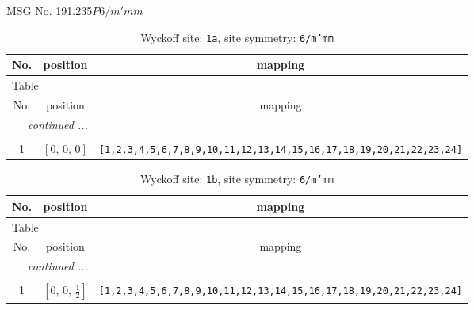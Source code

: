\documentclass[fleqn,8pt]{jsarticle}
\begin{document}
\setcounter{MaxMatrixCols}{32}

\renewcommand{\tablename}{Table~}
\renewcommand{\figurename}{Figure~}
\begin{center}
\LARGE
MSG No. 191.235\quad$P6/m'mm$
\end{center}
\renewcommand{\arraystretch}{1.2}
\begin{longtable}{ccc}
\caption{Wyckoff site: {\tt 1a}, site symmetry: {\tt 6/m'mm}}
 \\
 \hline \hline
No. & position & mapping \\ \hline \endfirsthead

\multicolumn{2}{l}{\tablename\ \thetable{}} \\
 \hline \hline
No. & position & mapping \\ \hline \endhead

 \hline \hline
\multicolumn{2}{r}{\footnotesize\it continued ...} \\ \endfoot

 \hline \hline
\multicolumn{2}{r}{} \\ \endlastfoot

1 & $\left[ 0,\, 0,\, 0 \right]$ & {\tt [1,2,3,4,5,6,7,8,9,10,11,12,13,14,15,16,17,18,19,20,21,22,23,24]} \\
\end{longtable}
\renewcommand{\arraystretch}{1.2}
\begin{longtable}{ccc}
\caption{Wyckoff site: {\tt 1b}, site symmetry: {\tt 6/m'mm}}
 \\
 \hline \hline
No. & position & mapping \\ \hline \endfirsthead

\multicolumn{2}{l}{\tablename\ \thetable{}} \\
 \hline \hline
No. & position & mapping \\ \hline \endhead

 \hline \hline
\multicolumn{2}{r}{\footnotesize\it continued ...} \\ \endfoot

 \hline \hline
\multicolumn{2}{r}{} \\ \endlastfoot

1 & $\left[ 0,\, 0,\, \frac{1}{2} \right]$ & {\tt [1,2,3,4,5,6,7,8,9,10,11,12,13,14,15,16,17,18,19,20,21,22,23,24]} \\
\end{longtable}
\renewcommand{\arraystretch}{1.2}
\end{document}
